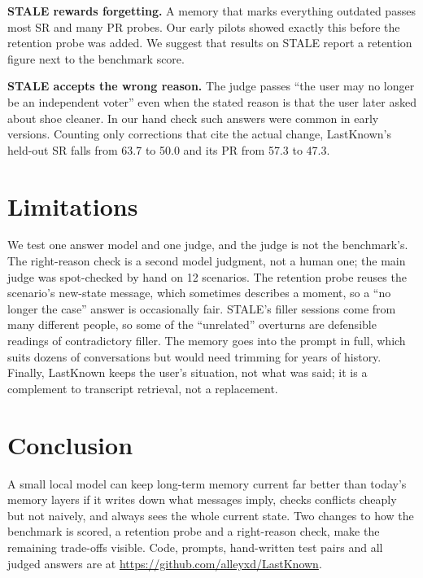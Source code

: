 \documentclass[10pt,twocolumn]{article}
\begin{document}
\textbf{STALE rewards forgetting.} A memory that marks everything outdated passes most SR and many PR probes. Our
early pilots showed exactly this before the retention probe was added. We suggest that results on STALE report a
retention figure next to the benchmark score.

\textbf{STALE accepts the wrong reason.} The judge passes ``the user may no longer be an independent voter'' even when
the stated reason is that the user later asked about shoe cleaner. In our hand check such answers were common in early
versions. Counting only corrections that cite the actual change, LastKnown's held-out SR falls from 63.7 to 50.0 and its PR
from 57.3 to 47.3.

\section{Limitations}

We test one answer model and one judge, and the judge is not the benchmark's. The right-reason check is a second
model judgment, not a human one; the main judge was spot-checked by hand on 12 scenarios. The retention probe reuses
the scenario's new-state message, which sometimes describes a moment, so a ``no longer the case'' answer is
occasionally fair. STALE's filler sessions come from many different people, so some of the ``unrelated'' overturns are
defensible readings of contradictory filler. The memory goes into the prompt in full, which suits dozens of
conversations but would need trimming for years of history. Finally, LastKnown keeps the user's situation, not what was
said; it is a complement to transcript retrieval, not a replacement.

\section{Conclusion}

A small local model can keep long-term memory current far better than today's memory layers if it writes down what
messages imply, checks conflicts cheaply but not naively, and always sees the whole current state. Two changes to how
the benchmark is scored, a retention probe and a right-reason check, make the remaining trade-offs visible. Code,
prompts, hand-written test pairs and all judged answers are at \url{https://github.com/alleyxd/LastKnown}.
\end{document}
